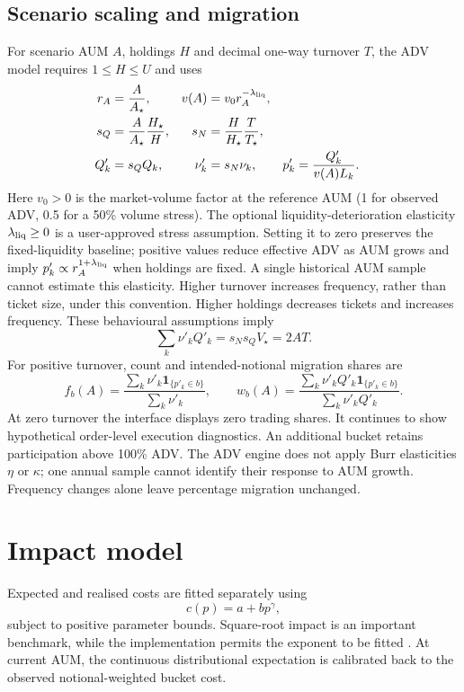 \documentclass[11pt,a4paper]{article}
\numberwithin{equation}{section}
\begin{document}
\subsection{Scenario scaling and migration}\label{sec:advscaling}
For scenario AUM $A$, holdings $H$ and decimal one-way turnover $T$, the ADV model requires
$1\leq H\leq U$ and uses
\begin{equation}\label{eq:advscaling}
 \begin{aligned}
 r_A&=\frac{A}{A_\star}, & v(A)&=v_0r_A^{-\lambda_{\rm liq}},\\
 s_Q&=\frac{A}{A_\star}\frac{H_\star}{H}, &
 s_N&=\frac{H}{H_\star}\frac{T}{T_\star},\\
 Q'_k&=s_QQ_k, & \nu'_k&=s_N\nu_k, & p'_k&=\frac{Q'_k}{v(A)L_k}.
 \end{aligned}
\end{equation}
Here $v_0>0$ is the market-volume factor at the reference AUM (1 for observed ADV, 0.5 for a
50\% volume stress). The optional liquidity-deterioration elasticity $\lambda_{\rm liq}\geq0$
is a user-approved stress assumption. Setting it to zero preserves the fixed-liquidity baseline;
positive values reduce effective ADV as AUM grows and imply $p'_k\propto r_A^{1+\lambda_{\rm liq}}$
when holdings are fixed. A single historical AUM sample cannot estimate this elasticity.
Higher turnover increases frequency, rather than ticket size, under this convention.
Higher holdings decreases tickets and increases frequency. These behavioural assumptions imply
\begin{equation}\label{eq:conservation}
 \sum_k\nu'_kQ'_k=s_Ns_QV_\star=2AT.
\end{equation}
For positive turnover, count and intended-notional migration shares are
\begin{equation}\label{eq:advmigration}
 f_b(A)=\frac{\sum_k\nu'_k\mathbf{1}_{\{p'_k\in b\}}}{\sum_k\nu'_k},\qquad
 w_b(A)=\frac{\sum_k\nu'_kQ'_k\mathbf{1}_{\{p'_k\in b\}}}{\sum_k\nu'_kQ'_k}.
\end{equation}
At zero turnover the interface displays zero trading shares. It continues to show hypothetical
order-level execution diagnostics. An additional bucket retains participation above 100\% ADV.
The ADV engine does not apply Burr elasticities $\eta$ or $\kappa$; one annual sample cannot
identify their response to AUM growth. Frequency changes alone leave percentage migration unchanged.

\section{Impact model}
Expected and realised costs are fitted separately using
\begin{equation}\label{eq:impact}
 c(p)=a+bp^\gamma,
\end{equation}
subject to positive parameter bounds. Square-root impact is an important benchmark, while the
implementation permits the exponent to be fitted \cite{farmer2011}. At current AUM, the continuous
distributional expectation is calibrated back to the observed notional-weighted bucket cost.
\end{document}
